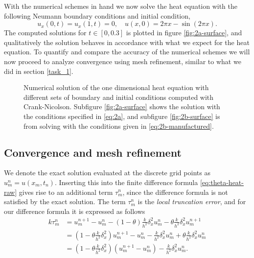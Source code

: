 With the numerical schemes in hand we now solve the heat equation with the following Neumann boundary conditions and initial condition, 
\begin{equation}
    u_x(0,t) = u_x(1,t) = 0, \quad u(x,0) = 2\pi x - \sin(2\pi x). 
    \label{eq:2a}
\end{equation}
The computed solutions for $t \in [0, 0.3]$ is plotted in figure \ref{fig:2a-surface}, 
and qualitatively the solution behaves in accordance with what we expect for the heat equation. 
To quantify and compare the accuracy of the numerical schemes we will now proceed to analyze convergence using mesh refinement, 
similar to what we did in section \ref{task_1}. 

%    

\begin{figure}[hb]
    \caption{
        Numerical solution of the one dimensional heat equation with different sets of boundary and initial conditions computed with Crank-Nicolson. 
        Subfigure \ref{fig:2a-surface} shows the solution with the conditions specified in \eqref{eq:2a}, 
        and subfigure \ref{fig:2b-surface} is from solving with the conditions given in \eqref{eq:2b-manufactured}. 
    }
\end{figure}


%    

\subsection{Convergence and mesh refinement}
We denote the exact solution evaluated at the discrete grid points as $u_m^n = u(x_m, t_n)$. 
Inserting this into the finite difference formula \eqref{eq:theta-heat-raw} gives rise to an additional term $\tau_m^n$, 
since the difference formula is not satisfied by the exact solution. 
The term $\tau_m^n$ is the \textit{local truncation error}, 
and for our difference formula it is expressed as follows 
\begin{align*}
    k\tau_m^n & = u_m^{n+1} - u_m^n - (1-\theta)\frac{k}{h^2}\delta_x^2 u_m^n - \theta\frac{k}{h^2}\delta_x^2 u_m^{n+1}\\
    & = (1 - \theta\frac{k}{h^2}\delta_x^2)u_m^{n+1} - u_m^n-\frac{k}{h^2}\delta_x^2 u_m^n + \theta\frac{k}{h^2}\delta_x^2u_m^n\\
    & = (1 - \theta\frac{k}{h^2}\delta_x^2)(u_m^{n+1} - u_m^n) - \frac{k}{h^2}\delta_x^2 u_m^n.
\end{align*}

